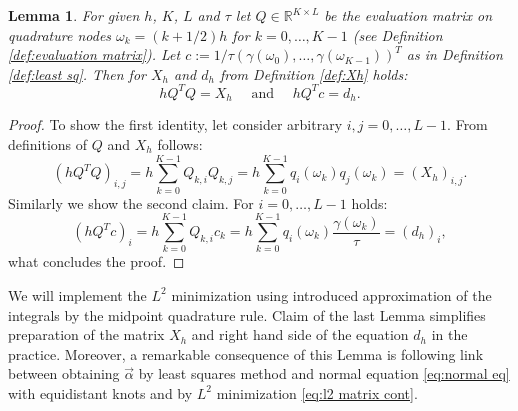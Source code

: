 \documentclass[a4paper,11pt,bibliography=totoc,listof=totoc,headinclude=true,cleardoublepage=empty,oneside]{scrbook}
\newtheorem{lemma}[theorem]{Lemma}
\newcommand{\R}{\mathbb{R}}
\begin{document}
    
\begin{lemma}\label{lemma:QTQ}
    For given $h$, $K$, $L$ and $\tau$ let $Q \in \R^{K\times L}$ be the evaluation matrix on quadrature nodes $\omega_k = (k+1/2)h$ for $k = 0, \dots, K-1$ (see Definition \ref{def:evaluation matrix}). Let $c := 1/\tau \left(\gamma(\omega_0), \dots, \gamma(\omega_{K-1})\right)^T$ as in Definition \ref{def:least sq}.
    Then for $X_h$ and $d_h$ from Definition \ref{def:Xh} holds: 
    \begin{equation*}\label{eq:link QTQ=X}
        h Q^T Q = X_h \quad \text{ and } \quad h Q^Tc = d_h.
    \end{equation*}
\end{lemma}
\begin{proof}
    To show the first identity, let consider arbitrary $i, j = 0, \dots, L-1$. From definitions of $Q$ and $X_h$ follows:
    \begin{equation*}
        \left(hQ^TQ\right)_{i,j} =  h \sum_{k=0}^{K-1} Q_{k,i} Q_{k,j} = h \sum_{k=0}^{K-1} q_i(\omega_k)q_j(\omega_k) = (X_h)_{i,j}.
    \end{equation*}
    Similarly we show the second claim. For $i = 0, \dots, L-1$ holds:
    \begin{equation*}
        \left(hQ^T c\right)_i = h \sum_{k=0}^{K-1} Q_{k,i}c_k = h\sum_{k=0}^{K-1} q_i(\omega_k) \frac{\gamma(\omega_k)}{\tau} = \left(d_h\right)_i,
    \end{equation*}
    what concludes the proof.
\end{proof}

We will implement the $L^2$ minimization using introduced approximation of the integrals by the midpoint quadrature rule. Claim of the last Lemma simplifies preparation of the matrix $X_h$ and right hand side of the equation $d_h$ in the practice. Moreover, a remarkable consequence of this Lemma is following link between obtaining $\Vec{\alpha}$ by least squares method and normal equation \eqref{eq:normal eq} with equidistant knots and by $L^2$ minimization \eqref{eq:l2 matrix cont}. 
\end{document}
